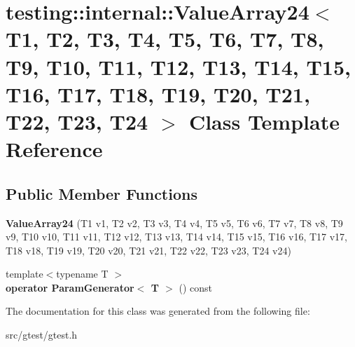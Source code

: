 \hypertarget{classtesting_1_1internal_1_1_value_array24}{}\section{testing\+:\+:internal\+:\+:Value\+Array24$<$ T1, T2, T3, T4, T5, T6, T7, T8, T9, T10, T11, T12, T13, T14, T15, T16, T17, T18, T19, T20, T21, T22, T23, T24 $>$ Class Template Reference}
\label{classtesting_1_1internal_1_1_value_array24}
\subsection*{Public Member Functions}
\begin{DoxyCompactItemize}
\item 
\mbox{\label{classtesting_1_1internal_1_1_value_array24_abee2a51b2ed37f05ccecf7f2d5f43106}} 
{\bfseries Value\+Array24} (T1 v1, T2 v2, T3 v3, T4 v4, T5 v5, T6 v6, T7 v7, T8 v8, T9 v9, T10 v10, T11 v11, T12 v12, T13 v13, T14 v14, T15 v15, T16 v16, T17 v17, T18 v18, T19 v19, T20 v20, T21 v21, T22 v22, T23 v23, T24 v24)
\item 
\mbox{\label{classtesting_1_1internal_1_1_value_array24_a6832c33cb80f6e0ff5fd0c557e743442}} 
{\footnotesize template$<$typename T $>$ }\\{\bfseries operator Param\+Generator$<$ T $>$} () const
\end{DoxyCompactItemize}


The documentation for this class was generated from the following file\+:\begin{DoxyCompactItemize}
\item 
src/gtest/gtest.\+h\end{DoxyCompactItemize}
